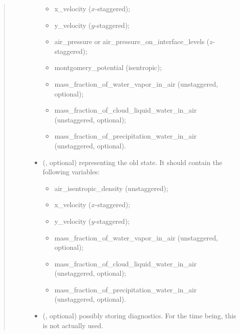 \documentclass[letterpaper,10pt,english]{sphinxmanual}
\begin{document}
\begin{fulllineitems}
\begin{fulllineitems}
\begin{quote}
\begin{description}
\begin{itemize}
\begin{itemize}
\item {} 
x\_velocity (\(x\)-staggered);

\item {} 
y\_velocity (\(y\)-staggered);

\item {} 
air\_pressure or air\_pressure\_on\_interface\_levels (\(z\)-staggered);

\item {} 
montgomery\_potential (isentropic);

\item {} 
mass\_fraction\_of\_water\_vapor\_in\_air (unstaggered, optional);

\item {} 
mass\_fraction\_of\_cloud\_liquid\_water\_in\_air (unstaggered, optional);

\item {} 
mass\_fraction\_of\_precipitation\_water\_in\_air (unstaggered, optional).

\end{itemize}


\item {} 
 (, optional) \textendash{} 
{\hyperref[\detokenize{api:tasmania.storages.state_isentropic.StateIsentropic}]{}} representing the old state.
It should contain the following variables:
\begin{itemize}
\item {} 
air\_isentropic\_density (unstaggered);

\item {} 
x\_velocity (\(x\)-staggered);

\item {} 
y\_velocity (\(y\)-staggered);

\item {} 
mass\_fraction\_of\_water\_vapor\_in\_air (unstaggered, optional);

\item {} 
mass\_fraction\_of\_cloud\_liquid\_water\_in\_air (unstaggered, optional);

\item {} 
mass\_fraction\_of\_precipitation\_water\_in\_air (unstaggered, optional).

\end{itemize}


\item {} 
 (, optional) \textendash{} {\hyperref[\detokenize{api:tasmania.storages.grid_data.GridData}]{}} possibly storing diagnostics.
For the time being, this is not actually used.


\end{itemize}
\end{description}
\end{quote}
\end{fulllineitems}
\end{fulllineitems}
\end{document}
